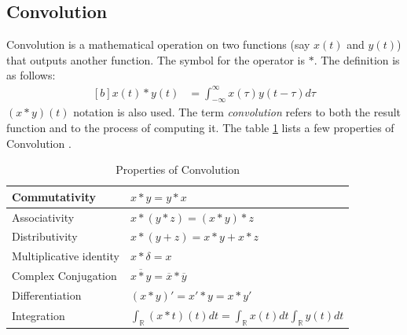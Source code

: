 \documentclass[letterpaper, 11pt]{article}
\newcommand{\fint}{\int_{-\infty}^{\infty}} %
\newcommand{\conv}[4]{\fint #3(#2)#4(#1 - #2) d#2} %
\numberwithin{equation}{section}
\numberwithin{figure}{section}
\numberwithin{table}{section}
\begin{document}
\subsection{Convolution}
Convolution is a mathematical operation on two functions (say \(x(t)\) and \(y(t)\)) that outputs another function. The symbol for the operator is \(*\). The definition is as follows:
\begin{equation}
	\begin{aligned}[b]
		x(t)*y(t)
			&= \conv{t}{\tau}{x}{y}
			\label{eq:convolution}
	\end{aligned}
\end{equation}
\((x*y)(t)\) notation is also used. The term \emph{convolution} refers to both the result function and to the process of computing it. The table \ref{tab:convolution} lists a few properties of Convolution \cite{arfken}.
\begin{table}
	\centering
	\caption[optional argument]{Properties of Convolution}
	\begin{tabular}{|l|l|}
		\hline
		Commutativity	& \(x*y = y*x\) \\
		\hline
		Associativity	& \(x*(y*z) = (x*y)*z \) \\
		\hline
		Distributivity	& \(x*(y + z) = x*y + x*z \) \\
		\hline
		Multiplicative identity	& \(x*\delta = x \)\\
		\hline
		Complex Conjugation	& \(\overline{x*y} = \overline{x}*\overline{y}\) \\
		\hline
		Differentiation	& \((x*y)' = x'*y = x*y' \) \\
		\hline
		Integration	& \(\int_{\mathbb{R}}(x*t)(t) dt
					= \int_{\mathbb{R}} x(t) dt
					  \int_{\mathbb{R}} y(t) dt\) \\
		\hline
	\end{tabular}
	\label{tab:convolution}
\end{table}
\end{document}
